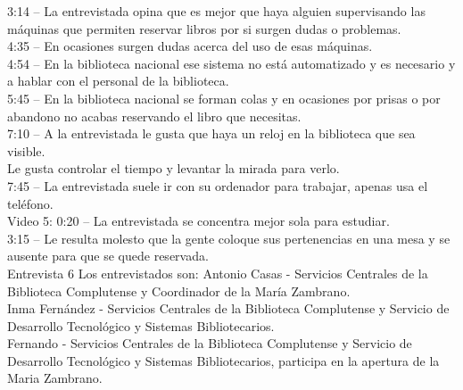 \documentclass[12pt]{article}
\begin{document}
3:14 – La entrevistada opina que es mejor que haya alguien supervisando las máquinas que permiten reservar libros por si surgen dudas o problemas.\\ 
4:35 – En ocasiones surgen dudas acerca del uso de esas máquinas.\\ 
4:54 – En la biblioteca nacional ese sistema no está automatizado y es necesario y a hablar con el personal de la biblioteca.\\ 
5:45 – En la biblioteca nacional se forman colas y en ocasiones por prisas o por abandono no acabas reservando el libro que necesitas.\\ 
7:10 – A la entrevistada le gusta que haya un reloj en la biblioteca que sea visible.\\ Le gusta controlar el tiempo  y levantar la mirada para verlo.\\ 
7:45 – La entrevistada suele ir con su ordenador para trabajar, apenas usa el teléfono.\\ 
 Video 5: 
0:20 – La entrevistada se concentra mejor sola para estudiar.\\ 
3:15 – Le resulta molesto que la gente coloque sus pertenencias en una mesa y se ausente para que se quede reservada.\\ 
Entrevista 6
Los entrevistados son:
Antonio Casas - Servicios Centrales de la Biblioteca Complutense y Coordinador de la María Zambrano.\\
Inma Fernández - Servicios Centrales de la Biblioteca Complutense y Servicio de Desarrollo Tecnológico y Sistemas Bibliotecarios.\\
Fernando - Servicios Centrales de la Biblioteca Complutense y Servicio de Desarrollo Tecnológico y Sistemas Bibliotecarios, participa en la apertura de la Maria Zambrano.\\
\end{document}
